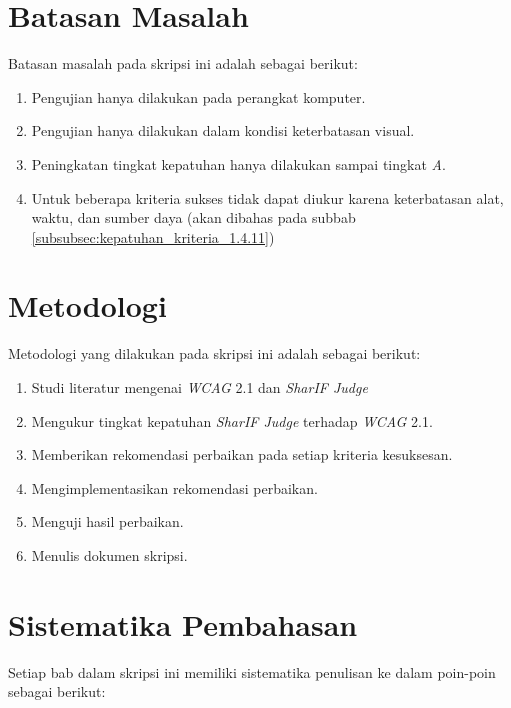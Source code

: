 \section{Batasan Masalah}
\label{sec:batasan}
Batasan masalah pada skripsi ini adalah sebagai berikut:

\begin{enumerate}
	\item Pengujian hanya dilakukan pada perangkat komputer.
	\item Pengujian hanya dilakukan dalam kondisi keterbatasan visual.
	\item Peningkatan tingkat kepatuhan hanya dilakukan sampai tingkat \textit{A}.
	\item Untuk beberapa kriteria sukses tidak dapat diukur karena keterbatasan alat, waktu, dan sumber daya (akan dibahas pada subbab \ref{subsubsec:kepatuhan_kriteria_1.4.11})
\end{enumerate}

\section{Metodologi}
\label{sec:metlit}
Metodologi yang dilakukan pada skripsi ini adalah sebagai berikut:

\begin{enumerate}
	\item Studi literatur mengenai \textit{WCAG} 2.1 dan \textit{SharIF Judge}
	\item Mengukur tingkat kepatuhan \textit{SharIF Judge} terhadap \textit{WCAG} 2.1.
	\item Memberikan rekomendasi perbaikan pada setiap kriteria kesuksesan.
	\item Mengimplementasikan rekomendasi perbaikan.
	\item Menguji hasil perbaikan.
	\item Menulis dokumen skripsi.
\end{enumerate}

\section{Sistematika Pembahasan}
\label{sec:sispem}
Setiap bab dalam skripsi ini memiliki sistematika penulisan ke dalam poin-poin sebagai berikut:

